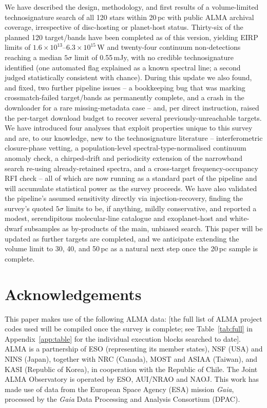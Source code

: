 \documentclass{openjournal}
\begin{document}
We have described the design, methodology, and first results of a
volume-limited technosignature search of all 120 stars within 20\,pc
with public ALMA archival coverage, irrespective of disc-hosting or
planet-host status. Thirty-six of the planned 120 target/bands have been
completed as of this version, yielding EIRP limits of
$1.6\times10^{13}$--$6.3\times10^{15}$\,W and twenty-four continuum
non-detections reaching a median $5\sigma$ limit of 0.55\,mJy, with no
credible technosignature identified (one automated flag explained as a
known spectral line; a second judged statistically consistent with
chance). During this update we also found, and fixed, two further
pipeline issues -- a bookkeeping bug that was marking crossmatch-failed
target/bands as permanently complete, and a crash in the downloader for
a rare missing-metadata case -- and, per direct instruction, raised the
per-target download budget to recover several previously-unreachable
targets. We have introduced four analyses
that exploit properties unique to this survey and are, to our knowledge,
new to the technosignature literature -- interferometric closure-phase
vetting, a population-level spectral-type-normalised continuum anomaly
check, a chirped-drift and periodicity extension of the narrowband
search re-using already-retained spectra, and a cross-target
frequency-occupancy RFI check -- all of which are now running as a
standard part of the pipeline and will accumulate statistical power as
the survey proceeds. We have also validated the pipeline's assumed
sensitivity directly via injection-recovery, finding the survey's
quoted $5\sigma$ limits to be, if anything, mildly conservative, and
reported a modest, serendipitous molecular-line catalogue and
exoplanet-host and white-dwarf subsamples as by-products of the main,
unbiased search. This paper will be updated as further targets are
completed, and we anticipate extending the volume limit to 30, 40, and
50\,pc as a natural next step once the 20\,pc sample is complete.

\section*{Acknowledgements}
This paper makes use of the following ALMA data: [the full list of ALMA
project codes used will be compiled once the survey is complete; see
Table~\ref{tab:full} in Appendix~\ref{app:table} for the individual
execution blocks searched to date]. ALMA is a partnership of ESO
(representing its member states), NSF (USA) and NINS (Japan), together with NRC
(Canada), MOST and ASIAA (Taiwan), and KASI (Republic of Korea), in cooperation
with the Republic of Chile. The Joint ALMA Observatory is operated by ESO,
AUI/NRAO and NAOJ. This work has made use of data from the European Space
Agency (ESA) mission {\it Gaia}, processed by the {\it Gaia} Data Processing and
Analysis Consortium (DPAC).
\end{document}
